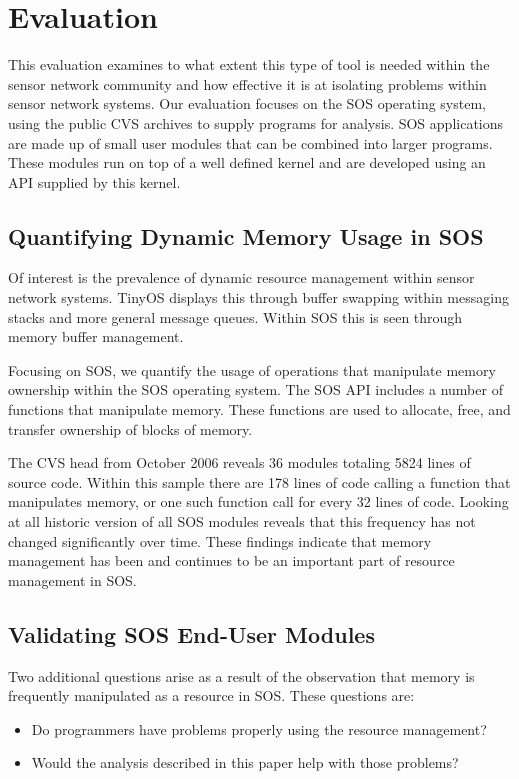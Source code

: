 \section{Evaluation}
\label{sec:eval}

This evaluation examines to what extent this type of tool is needed
within the sensor network community and how effective it is at
isolating problems within sensor network systems.  Our evaluation
focuses on the SOS operating system, using the public CVS archives to
supply programs for analysis.  SOS applications are made up of small
user modules that can be combined into larger programs.  These modules
run on top of a well defined kernel and are developed using an API
supplied by this kernel.


\subsection{Quantifying Dynamic Memory Usage in SOS}

Of interest is the prevalence of dynamic resource management within
sensor network systems.  TinyOS displays this through buffer swapping
within messaging stacks and more general message queues.  Within SOS
this is seen through memory buffer management.  

Focusing on SOS, we quantify the usage of operations that manipulate
memory ownership within the SOS operating system.  The SOS API
includes a number of functions that manipulate memory.  These
functions are used to allocate, free, and transfer ownership of blocks
of memory.  

The CVS head from October 2006 reveals 36 modules totaling 5824 lines
of source code.  Within this sample there are 178 lines of code
calling a function that manipulates memory, or one such function call
for every 32 lines of code.  Looking at all historic version of all
SOS modules reveals that this frequency has not changed significantly
over time.  These findings indicate that memory management has been
and continues to be an important part of resource management in SOS.


\subsection{Validating SOS End-User Modules}

Two additional questions arise as a result of the observation that
memory is frequently manipulated as a resource in SOS.  These
questions are:
%
\begin{itemize}
%
\item Do programmers have problems properly using the resource
management?
%
\item Would the analysis described in this paper help with
those problems?
%
\end{itemize}

